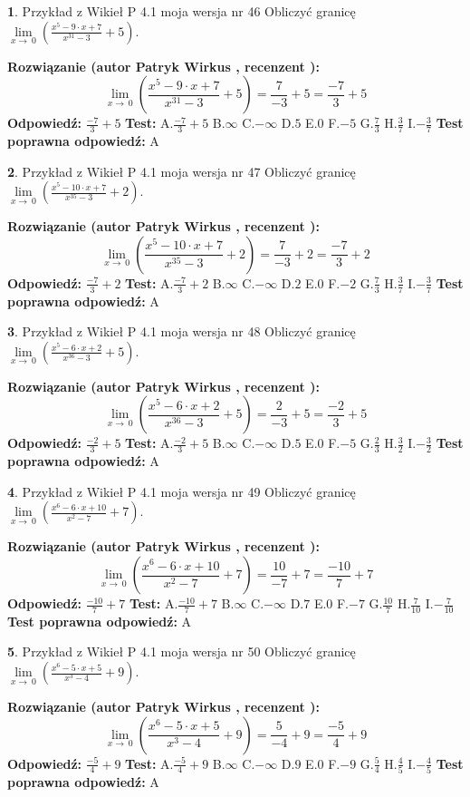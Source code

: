 \documentclass[12pt, a4paper]{article}
\theoremstyle{definition} %
\newtheorem{zad}{}
\newcommand{\zadStart}[1]{\begin{zad}#1\newline}
\newcommand{\zadStop}{\end{zad}}
\newcommand{\rozwStart}[2]{\noindent \textbf{Rozwiązanie (autor #1 , recenzent #2): }\newline}
\newcommand{\rozwStop}{\newline}
\newcommand{\odpStart}{\noindent \textbf{Odpowiedź:}\newline}
\newcommand{\odpStop}{\newline}
\newcommand{\testStart}{\noindent \textbf{Test:}\newline}
\newcommand{\testStop}{\newline}
\newcommand{\kluczStart}{\noindent \textbf{Test poprawna odpowiedź:}\newline}
\newcommand{\kluczStop}{\newline}
\begin{document}
\zadStart{Przykład z Wikieł P 4.1 moja wersja nr 46}
Obliczyć granicę $\lim\limits_{x\to\ 0}(\frac{x^{5}-9 \cdot x +7}{x^{31}-3}+5)$.
\zadStop
\rozwStart{Patryk Wirkus}{}
$$\lim\limits_{x\to\ 0}(\frac{x^{5}-9 \cdot x +7}{x^{31}-3}+5)=\frac{7}{-3}+5=\frac{-7}{3}+5$$
\rozwStop
\odpStart
$\frac{-7}{3}+5$
\odpStop
\testStart
A.$\frac{-7}{3}+5$
B.$\infty$
C.$-\infty$
D.$5$
E.$0$
F.$-5$
G.$\frac{7}{3}$
H.$\frac{3}{7}$
I.$-\frac{3}{7}$
\testStop
\kluczStart
A
\kluczStop



\zadStart{Przykład z Wikieł P 4.1 moja wersja nr 47}
Obliczyć granicę $\lim\limits_{x\to\ 0}(\frac{x^{5}-10 \cdot x +7}{x^{35}-3}+2)$.
\zadStop
\rozwStart{Patryk Wirkus}{}
$$\lim\limits_{x\to\ 0}(\frac{x^{5}-10 \cdot x +7}{x^{35}-3}+2)=\frac{7}{-3}+2=\frac{-7}{3}+2$$
\rozwStop
\odpStart
$\frac{-7}{3}+2$
\odpStop
\testStart
A.$\frac{-7}{3}+2$
B.$\infty$
C.$-\infty$
D.$2$
E.$0$
F.$-2$
G.$\frac{7}{3}$
H.$\frac{3}{7}$
I.$-\frac{3}{7}$
\testStop
\kluczStart
A
\kluczStop



\zadStart{Przykład z Wikieł P 4.1 moja wersja nr 48}
Obliczyć granicę $\lim\limits_{x\to\ 0}(\frac{x^{5}-6 \cdot x +2}{x^{36}-3}+5)$.
\zadStop
\rozwStart{Patryk Wirkus}{}
$$\lim\limits_{x\to\ 0}(\frac{x^{5}-6 \cdot x +2}{x^{36}-3}+5)=\frac{2}{-3}+5=\frac{-2}{3}+5$$
\rozwStop
\odpStart
$\frac{-2}{3}+5$
\odpStop
\testStart
A.$\frac{-2}{3}+5$
B.$\infty$
C.$-\infty$
D.$5$
E.$0$
F.$-5$
G.$\frac{2}{3}$
H.$\frac{3}{2}$
I.$-\frac{3}{2}$
\testStop
\kluczStart
A
\kluczStop



\zadStart{Przykład z Wikieł P 4.1 moja wersja nr 49}
Obliczyć granicę $\lim\limits_{x\to\ 0}(\frac{x^{6}-6 \cdot x +10}{x^{2}-7}+7)$.
\zadStop
\rozwStart{Patryk Wirkus}{}
$$\lim\limits_{x\to\ 0}(\frac{x^{6}-6 \cdot x +10}{x^{2}-7}+7)=\frac{10}{-7}+7=\frac{-10}{7}+7$$
\rozwStop
\odpStart
$\frac{-10}{7}+7$
\odpStop
\testStart
A.$\frac{-10}{7}+7$
B.$\infty$
C.$-\infty$
D.$7$
E.$0$
F.$-7$
G.$\frac{10}{7}$
H.$\frac{7}{10}$
I.$-\frac{7}{10}$
\testStop
\kluczStart
A
\kluczStop



\zadStart{Przykład z Wikieł P 4.1 moja wersja nr 50}
Obliczyć granicę $\lim\limits_{x\to\ 0}(\frac{x^{6}-5 \cdot x +5}{x^{3}-4}+9)$.
\zadStop
\rozwStart{Patryk Wirkus}{}
$$\lim\limits_{x\to\ 0}(\frac{x^{6}-5 \cdot x +5}{x^{3}-4}+9)=\frac{5}{-4}+9=\frac{-5}{4}+9$$
\rozwStop
\odpStart
$\frac{-5}{4}+9$
\odpStop
\testStart
A.$\frac{-5}{4}+9$
B.$\infty$
C.$-\infty$
D.$9$
E.$0$
F.$-9$
G.$\frac{5}{4}$
H.$\frac{4}{5}$
I.$-\frac{4}{5}$
\testStop
\kluczStart
A
\kluczStop
\end{document}
